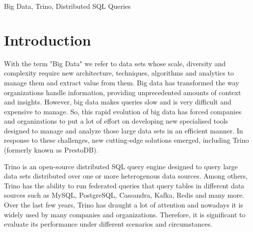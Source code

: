 \documentclass[conference]{IEEEtran}
\begin{document}
\begin{IEEEkeywords}
Big Data, Trino, Distributed SQL Queries
\end{IEEEkeywords}

\section{Introduction}
With the term "Big Data" we refer to data sets whose scale, diversity and complexity require new
architecture, techniques, algorithms and analytics to manage them and extract value from them.
Big data has transformed the way organizations handle information, providing unprecedented 
amounts of context and insights. However, big data makes queries slow and is very difficult and 
expensive to manage. So, this rapid evolution of big data has forced companies and organizations 
to put a lot of effort on  developing new specialised tools designed to manage and analyze those 
large data sets in an efficient manner. In response to these challenges, new cutting-edge solutions 
emerged, including Trino (formerly known as PrestoDB).

Trino is an open-source distributed SQL query engine designed to query large data sets distributed over
one or more heterogenous data sources. Among others, Trino has the ability to run federated queries that
query tables in different data sources such as MySQL, PostgreSQL, Cassandra, Kafka, Redis and many more.
Over the last few years, Trino has draught a lot of attention and nowadays it is widely used by many 
companies and organizations. Therefore, it is significant to evaluate its performance under different 
scenarios and circumstances.
\end{document}
